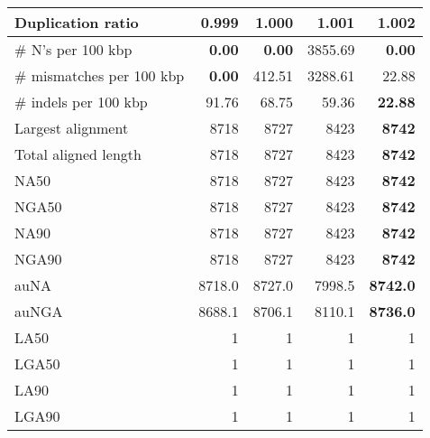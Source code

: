 \documentclass[12pt,a4paper]{article}
\begin{document}
\begin{table}[ht]
\begin{center}
\begin{tabular}{|l*{4}{|r}|}
Duplication ratio & {\bf 0.999} & 1.000 & 1.001 & 1.002 \\ \hline
\# N's per 100 kbp & {\bf 0.00} & {\bf 0.00} & 3855.69 & {\bf 0.00} \\ \hline
\# mismatches per 100 kbp & {\bf 0.00} & 412.51 & 3288.61 & 22.88 \\ \hline
\# indels per 100 kbp & 91.76 & 68.75 & 59.36 & {\bf 22.88} \\ \hline
Largest alignment & 8718 & 8727 & 8423 & {\bf 8742} \\ \hline
Total aligned length & 8718 & 8727 & 8423 & {\bf 8742} \\ \hline
NA50 & 8718 & 8727 & 8423 & {\bf 8742} \\ \hline
NGA50 & 8718 & 8727 & 8423 & {\bf 8742} \\ \hline
NA90 & 8718 & 8727 & 8423 & {\bf 8742} \\ \hline
NGA90 & 8718 & 8727 & 8423 & {\bf 8742} \\ \hline
auNA & 8718.0 & 8727.0 & 7998.5 & {\bf 8742.0} \\ \hline
auNGA & 8688.1 & 8706.1 & 8110.1 & {\bf 8736.0} \\ \hline
LA50 & 1 & 1 & 1 & 1 \\ \hline
LGA50 & 1 & 1 & 1 & 1 \\ \hline
LA90 & 1 & 1 & 1 & 1 \\ \hline
LGA90 & 1 & 1 & 1 & 1 \\ \hline
\end{tabular}
\end{center}
\end{table}
\end{document}
